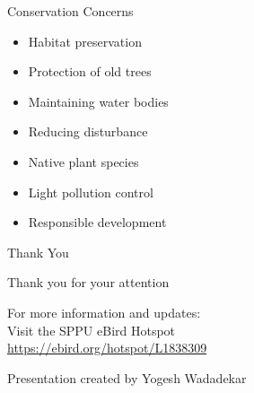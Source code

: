 \documentclass[aspectratio=169]{beamer}
\begin{document}
\begin{frame}{Conservation Concerns}
    \begin{itemize}
        \item Habitat preservation
        \item Protection of old trees
        \item Maintaining water bodies
        \item Reducing disturbance
        \item Native plant species
        \item Light pollution control
        \item Responsible development
    \end{itemize}
\end{frame}

\begin{frame}[plain]{Thank You}
    \begin{center}
        \vspace{2em}
        {\Large Thank you for your attention}
        \vspace{2em}
        
        For more information and updates:\\
        Visit the SPPU eBird Hotspot\\
        \url{https://ebird.org/hotspot/L1838309}
        
        \vspace{1em}
        {\small Presentation created by Yogesh Wadadekar}
    \end{center}
\end{frame}
\end{document}

